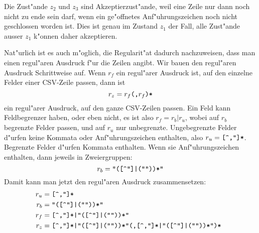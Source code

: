 {\begin{loesung}
Die Zust"ande $z_2$ und $z_3$ sind Akzeptierzust"ande, weil eine Zeile
nur dann noch nicht zu ende sein darf, wenn ein ge"offnetes Anf"uhrungszeichen
noch nicht geschlossen worden ist. Dies ist genau im Zustand $z_1$ der
Fall, alle Zust"ande ausser $z_1$ k"onnen daher akzeptieren.

Nat"urlich ist es auch m"oglich, die Regularit"at dadurch nachzuweisen,
dass man einen regul"aren Ausdruck f"ur die Zeilen angibt. Wir bauen
den regul"aren Ausdruck Schrittweise auf. Wenn $r_f$ ein regul"arer Ausdruck
ist, auf den einzelne Felder einer CSV-Zeile passen, dann ist
\[
r_z=r_f\text{\tt (,}r_f\text{\tt )*}
\]
ein regul"arer Ausdruck, auf den ganze CSV-Zeilen passen. Ein Feld kann
Feldbegrenzer haben, oder eben nicht, es ist also $r_f=r_b|r_u$, wobei
auf $r_b$ begrenzte Felder passen, und auf $r_u$ nur unbegrenzte.
Ungebegrenzte Felder d"urfen keine Kommata oder Anf"uhrungszeichen
enthalten, also $r_u=\text{\tt [\char94,\char34]*}$. Begrenzte Felder
d"urfen Kommata enthalten. Wenn sie Anf"uhrungszeichen enthalten,
dann jeweils in Zweiergruppen:
\[
r_b=\text{\tt
\char34([\char94\char34]|(\char34\char34))*\char34
}
\]
Damit kann man jetzt den regul"aren Ausdruck zusammensetzen:
\begin{align*}
r_u&=\text{\tt
[\char94,\char34]*
}\\
r_b&=\text{\tt
\char34([\char94\char34]|(\char34\char34))*\char34
}\\
r_f&=\text{\tt
[\char94,\char34]*|\char34([\char94\char34]|(\char34\char34))*\char34
}\\
r_z&=\text{\tt
[\char94,\char34]*|\char34([\char94\char34]|(\char34\char34))*\char34
(,%
[\char94,\char34]*|\char34([\char94\char34]|(\char34\char34))*\char34
)*
}
\end{align*}
\end{loesung}
}{}

